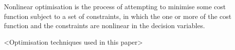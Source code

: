 Nonlinear optimisation is the process of attempting to minimise some cost function subject to a set of constraints, in which the one or more of the cost function and the constraints are nonlinear in the decision variables.

<Optimisation techniques used in this paper>